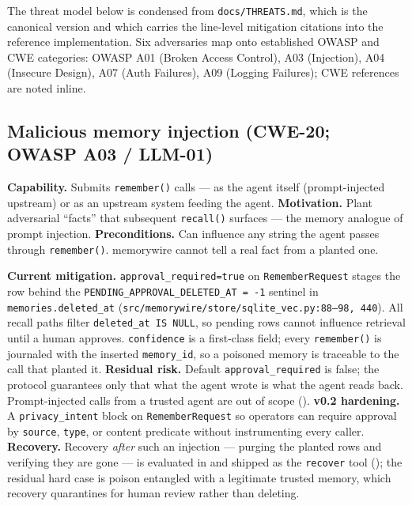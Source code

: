 \documentclass[11pt,letterpaper,twocolumn]{article}
\begin{document}
The threat model below is condensed from \texttt{docs/THREATS.md}, which is the canonical version and which carries the line-level mitigation citations into the reference implementation. Six adversaries map onto established OWASP and CWE categories: OWASP A01 (Broken Access Control), A03 (Injection), A04 (Insecure Design), A07 (Auth Failures), A09 (Logging Failures); CWE references are noted inline.

\subsection{Malicious memory injection (CWE-20; OWASP A03 / LLM-01)}
\label{sec:threats-injection}

\textbf{Capability.} Submits \texttt{remember()} calls --- as the agent itself (prompt-injected upstream) or as an upstream system feeding the agent. \textbf{Motivation.} Plant adversarial ``facts'' that subsequent \texttt{recall()} surfaces --- the memory analogue of prompt injection. \textbf{Preconditions.} Can influence any string the agent passes through \texttt{remember()}. memorywire cannot tell a real fact from a planted one.

\textbf{Current mitigation.} \texttt{approval\_required=true} on \texttt{RememberRequest} stages the row behind the \texttt{PENDING\_APPROVAL\_DELETED\_AT = -1} sentinel in \texttt{memories.deleted\_at} (\texttt{src/memorywire/store/sqlite\_vec.py:88--98, 440}). All recall paths filter \texttt{deleted\_at IS NULL}, so pending rows cannot influence retrieval until a human approves. \texttt{confidence} is a first-class field; every \texttt{remember()} is journaled with the inserted \texttt{memory\_id}, so a poisoned memory is traceable to the call that planted it. \textbf{Residual risk.} Default \texttt{approval\_required} is false; the protocol guarantees only that what the agent wrote is what the agent reads back. Prompt-injected calls from a trusted agent are out of scope (). \textbf{v0.2 hardening.} A \texttt{privacy\_intent} block on \texttt{RememberRequest} so operators can require approval by \texttt{source}, \texttt{type}, or content predicate without instrumenting every caller. \textbf{Recovery.} Recovery \emph{after} such an injection --- purging the planted rows and verifying they are gone --- is evaluated in  and shipped as the \texttt{recover} tool (); the residual hard case is poison entangled with a legitimate trusted memory, which recovery quarantines for human review rather than deleting.
\end{document}
